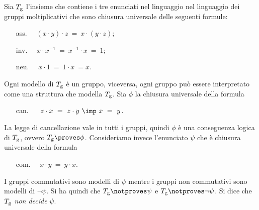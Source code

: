 \begin{example}\label{Tg}
Sia $T_{\rm g}$ l'insieme che contiene i tre enunciati nel linguaggio nel linguaggio dei gruppi moltiplicativi che sono chiusura universale delle seguenti formule:
\begin{itemize}
\item[ass.]\ \  $(x\cdot y)\cdot z\ =\ x\cdot(y\cdot z)$;
\item[inv.]\ \  $ x\cdot x^{-1}\ =\ x^{-1}\cdot x\ =\ 1$;
\item[neu.]\ \  $x\cdot 1\ =\ 1\cdot x\ =x$.
\end{itemize}
Ogni modello di $T_{\rm g}$ \`e un gruppo, viceversa, ogni gruppo pu\`o essere interpretato come una struttura che modella $T_{\rm g}$. Sia $\phi$ la chiusura universale della formula
\begin{itemize}
\item[can.]\ \  $\ z\cdot x\ =\  z\cdot y\ \imp\ x\ =\ y$. 
\end{itemize}
La legge di cancellazione vale in tutti i gruppi, quindi $\phi$ \`e una conseguenza logica di $T_{\rm g}$, ovvero $T_{\rm g} \proves\phi$. Consideriamo invece l'enunciato $\psi$ che \`e chiusura universale della formula
\begin{itemize}
\item[com.]\ \  $x\cdot y\ =\ y\cdot x$. 
\end{itemize}
I gruppi commutativi sono modelli di $\psi$ mentre i gruppi non commutativi sono modelli di $\neg\psi$. Si ha quindi che $T_{\rm g}\notproves\psi$ e $T_{\rm g}\notproves\neg\psi$. Si dice che $T_{\rm g}$ \emph{non decide\/} $\psi$.\QED
\end{example}

